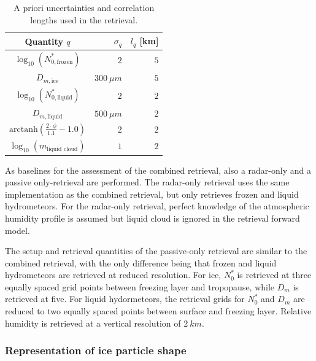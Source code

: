 \documentclass[journal abbreviation, manuscript]{copernicus}
\begin{document}
\begin{table}[h!]
\caption{A priori uncertainties and correlation
 lengths used in the retrieval.}
 \centering
\label{tab:a_priori}
    \begin{tabular}{c|r|r}
     Quantity $q$ & $\sigma_q$ & $l_q$ [km]\\
    \hline
    $\log_{10}(N_{0, \text{frozen}}^*)$    & $2$                       & $5$ \\
    $D_{m, \text{ice}}$               & $300\ \unit{\mu m}$          & $5$ \\
    $\log_{10}(N_{0, \text{liquid}}^*)$    & $2                      $ & $2$ \\
    $D_{m, \text{liquid}}$            & $500\ \unit{\mu m}$           & $2$ \\
    $\text{arctanh}(\frac{2 \cdot \phi}{1.1} - 1.0)$ & $2$       & $2$ \\
    $\log_{10}(m_\text{liquid cloud}) $ & $1$                       & $2$ \\
    \end{tabular}
\end{table}

As baselines for the assessment of the combined retrieval, also a radar-only and
a passive only-retrieval are performed. The radar-only retrieval uses the same
implementation as the combined retrieval, but only retrieves frozen and liquid
hydrometeors. For the radar-only retrieval, perfect knowledge of the atmospheric
humidity profile is assumed but liquid cloud is ignored in the retrieval forward
model.

The setup and retrieval quantities of the passive-only retrieval are similar to
the combined retrieval, with the only difference being that frozen and liquid
hydrometeors are retrieved at reduced resolution. For ice, $N_0^*$ is retrieved
at three equally spaced grid points between freezing layer and tropopause, while
$D_m$ is retrieved at five. For liquid hydormeteors, the retrieval grids for
$N_0^*$ and $D_m$ are reduced to two equally spaced points between surface and
freezing layer. Relative humidity is retrieved at a vertical resolution of
$2\ \unit{km}$.

\subsubsection{Representation of ice particle shape}
\label{sec:method:partilce_models}
\end{document}
